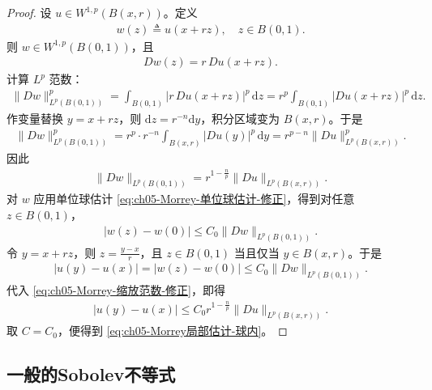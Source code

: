 \documentclass[../../main.tex]{subfiles}
\begin{document}
\begin{proof}
设 \(u\in W^{1,p}(B(x,r))\)。定义
\begin{align*}
w(z)\triangleq u(x+rz),\quad z\in B(0,1).
\end{align*}
则 \(w\in W^{1,p}(B(0,1))\)，且
\begin{align*}
Dw(z)=r\,Du(x+rz).
\end{align*}
计算 \(L^p\) 范数：
\begin{align*}
\|Dw\|_{L^p(B(0,1))}^p
=\int_{B(0,1)}|r\,Du(x+rz)|^p\,\mathrm{d}z=r^p\int_{B(0,1)}|Du(x+rz)|^p\,\mathrm{d}z.
\end{align*}
作变量替换 \(y=x+rz\)，则 \(\mathrm{d}z=r^{-n}\mathrm{d}y\)，积分区域变为 \(B(x,r)\)。于是
\begin{align*}
\|Dw\|_{L^p(B(0,1))}^p
=r^p\cdot r^{-n}\int_{B(x,r)}|Du(y)|^p\,\mathrm{d}y=r^{p-n}\|Du\|_{L^p(B(x,r))}^p.
\end{align*}
因此
\begin{align}\label{eq:ch05-Morrey-缩放范数-修正}
\|Dw\|_{L^p(B(0,1))}=r^{1-\frac{n}{p}}\|Du\|_{L^p(B(x,r))}.
\end{align}
对 \(w\) 应用单位球估计 \eqref{eq:ch05-Morrey-单位球估计-修正}，得到对任意 \(z\in B(0,1)\)，
\begin{align*}
|w(z)-w(0)|\leqslant C_0\|Dw\|_{L^p(B(0,1))}.
\end{align*}
令 \(y=x+rz\)，则 \(z=\frac{y-x}{r}\)，且 \(z\in B(0,1)\) 当且仅当 \(y\in B(x,r)\)。于是
\begin{align*}
|u(y)-u(x)|=|w(z)-w(0)|\leqslant C_0\|Dw\|_{L^p(B(0,1))}.
\end{align*}
代入 \eqref{eq:ch05-Morrey-缩放范数-修正}，即得
\begin{align*}
|u(y)-u(x)|\leqslant C_0 r^{1-\frac{n}{p}}\|Du\|_{L^p(B(x,r))}.
\end{align*}
取 \(C=C_0\)，便得到 \eqref{eq:ch05-Morrey局部估计-球内}。
\end{proof}


\subsection{一般的Sobolev不等式}\label{subsection:ch05-一般Sobolev不等式}
\end{document}
